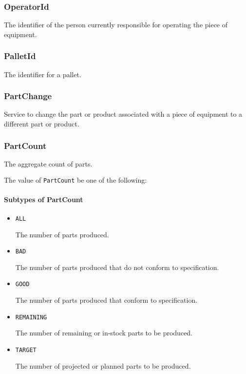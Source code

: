 \subsubsection{OperatorId}
\label{sec:OperatorId}



The identifier of the person currently responsible for operating the piece of equipment.


\subsubsection{PalletId}
\label{sec:PalletId}



The identifier for a pallet.


\subsubsection{PartChange}
\label{sec:PartChange}



Service to change the part or product associated with a piece of equipment to a different part or product.


\subsubsection{PartCount}
\label{sec:PartCount}



The aggregate count of parts.


The value of \texttt{PartCount} \MUST be one of the following: 

\FloatBarrier

\paragraph{Subtypes of PartCount}\mbox{}
\label{sec:Subtypes of PartCount}

\begin{itemize}

\item \texttt{ALL}


The number of parts produced. 

\item \texttt{BAD}


The number of parts produced that do not conform to specification.

\item \texttt{GOOD}


The number of parts produced that conform to specification.


\item \texttt{REMAINING}


The number of remaining or in-stock parts to be produced.

\item \texttt{TARGET}


The number of projected or planned parts to be produced.


\end{itemize}

